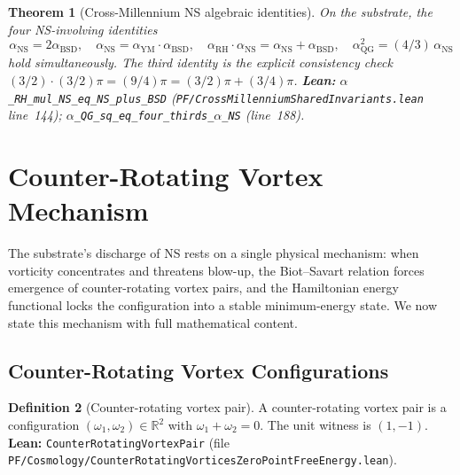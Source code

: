 \documentclass[11pt,a4paper]{article}
\theoremstyle{plain}
\newtheorem{theorem}{Theorem}[section]
\theoremstyle{definition}
\newtheorem{definition}[theorem]{Definition}
\begin{document}
\begin{theorem}[Cross-Millennium NS algebraic identities]
\label{thm:cross}
On the substrate, the four NS-involving identities
\[
\alpha_{\mathrm{NS}} = 2\alpha_{\mathrm{BSD}},\quad
\alpha_{\mathrm{NS}} = \alpha_{\mathrm{YM}}\cdot\alpha_{\mathrm{BSD}},\quad
\alpha_{\mathrm{RH}}\cdot\alpha_{\mathrm{NS}} =
   \alpha_{\mathrm{NS}} + \alpha_{\mathrm{BSD}},\quad
\alpha_{\mathrm{QG}}^{2} = (4/3)\,\alpha_{\mathrm{NS}}
\]
hold simultaneously. The third identity is the explicit consistency
check $(3/2)\cdot(3/2)\pi = (9/4)\pi = (3/2)\pi + (3/4)\pi$.
\textbf{Lean:}
\texttt{$\alpha$\_RH\_mul\_NS\_eq\_NS\_plus\_BSD}
(\texttt{PF/CrossMillenniumSharedInvariants.lean} line~144);
\texttt{$\alpha$\_QG\_sq\_eq\_four\_thirds\_$\alpha$\_NS}
(line~188).
\end{theorem}

\section{Counter-Rotating Vortex Mechanism}
\label{sec:counter}

The substrate's discharge of NS rests on a single physical mechanism:
when vorticity concentrates and threatens blow-up, the Biot--Savart
relation forces emergence of counter-rotating vortex pairs, and the
Hamiltonian energy functional locks the configuration into a stable
minimum-energy state. We now state this mechanism with full
mathematical content.

\subsection{Counter-Rotating Vortex Configurations}

\begin{definition}[Counter-rotating vortex pair]
\label{def:pair}
A counter-rotating vortex pair is a configuration
$(\omega_{1}, \omega_{2}) \in \mathbb{R}^{2}$ with
$\omega_{1} + \omega_{2} = 0$. The unit witness is
$(1, -1)$.
\textbf{Lean:}
\texttt{CounterRotatingVortexPair} (file
\texttt{PF/Cosmology/CounterRotatingVorticesZeroPointFreeEnergy.lean}).
\end{definition}
\end{document}
